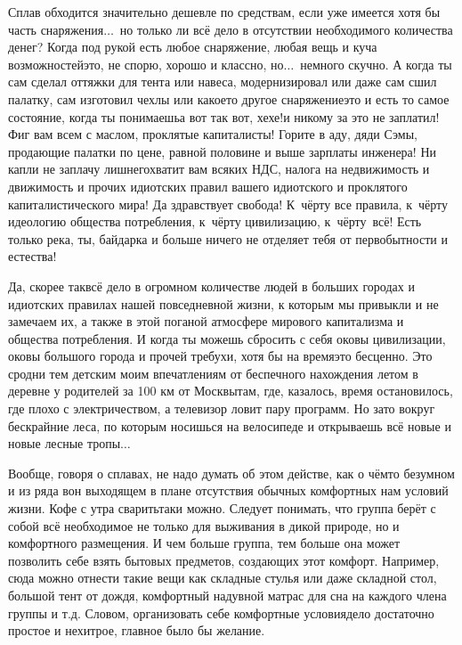 Сплав обходится значительно дешевле по средствам, если уже имеется хотя бы часть снаряжения$\ldots$~но только ли всё дело в отсутствии необходимого количества денег? Когда под рукой есть любое снаряжение, любая вещь и куча возможностей\mdash это, не спорю, хорошо и классно, но$\ldots$~немного скучно. А когда ты сам сделал оттяжки для тента или навеса, модернизировал или даже сам сшил палатку, сам изготовил чехлы или какое\sdash то другое снаряжение\mdash это и есть то самое состояние, когда ты понимаешь\mdash а вот так вот, хе\sdash хе!\mdash и никому за это не заплатил! Фиг вам всем с маслом, проклятые капиталисты! Горите в аду, дяди Сэмы, продающие палатки по цене, равной половине и выше зарплаты инженера!  Ни капли не заплачу лишнего\mdash хватит вам всяких НДС, налога на недвижимость и движимость и прочих идиотских правил вашего идиотского и проклятого капиталистического мира! Да здравствует свобода! К~чёрту все правила, к~чёрту идеологию общества потребления, к~чёрту цивилизацию, к~чёрту~всё! Есть только река, ты, байдарка и больше ничего не отделяет тебя от первобытности и естества! 

Да, скорее так\mdash всё дело в огромном количестве людей в больших городах и идиотских правилах нашей повседневной жизни, к которым мы привыкли и не замечаем их, а также в этой поганой атмосфере мирового капитализма и общества потребления. И когда ты можешь сбросить с себя оковы цивилизации, оковы большого города и прочей требухи, хотя бы на время\mdash это бесценно. Это сродни тем детским моим впечатлениям от беспечного нахождения летом в деревне у родителей за 100 км от Москвы\mdash там, где, казалось, время остановилось, где плохо с электричеством, а телевизор ловит пару программ. Но зато вокруг бескрайние леса, по которым носишься на велосипеде и открываешь всё новые и новые лесные тропы$\ldots$ 

Вообще, говоря о сплавах, не надо думать об этом действе, как о чём\sdash то безумном и из ряда вон выходящем в плане отсутствия обычных комфортных нам условий жизни. Кофе с утра сварить\sdash таки можно. Следует понимать, что группа берёт с собой всё необходимое не только для выживания в дикой природе, но и комфортного размещения. И чем больше группа, тем больше она может позволить себе взять бытовых предметов, создающих этот комфорт. Например, сюда можно отнести такие вещи как складные стулья или даже складной стол, большой тент от дождя, комфортный надувной матрас для сна на каждого члена группы и т.д. Словом, организовать себе комфортные условия\mdash дело достаточно простое и нехитрое, главное было бы желание. 

